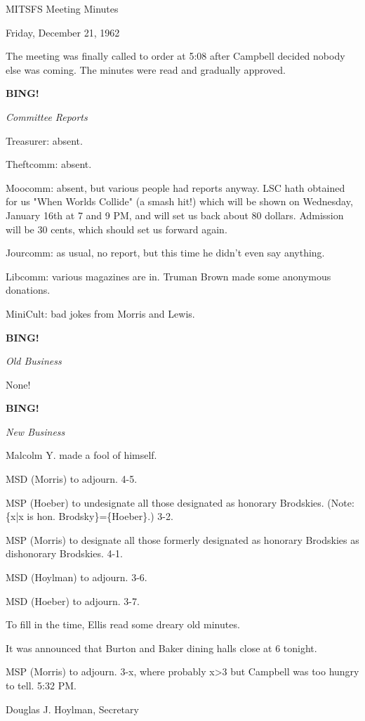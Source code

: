 \documentclass[12pt]{article}
\newcommand{\bing}{{\bf BING!} }
\newcommand{\goto}[1]{\bing \vskip 12pt \centerline{{\em{#1}}}}
\begin{document}
\begin{center}

MITSFS Meeting Minutes

Friday, December 21, 1962

\end{center}
 
\vspace{12pt}

\setlength{\parskip}{6pt}

\noindent
The meeting was finally called to order at 5:08 after Campbell decided nobody else was coming. The minutes were read and gradually approved.

\goto{Committee Reports}

Treasurer: absent.

Theftcomm: absent.

Moocomm: absent, but various people had reports anyway. LSC hath obtained for us "When Worlds Collide" (a smash hit!) which will be shown on Wednesday, January 16th at 7 and 9 PM, and will set us back about 80 dollars. Admission will be 30 cents, which should set us forward again.

Jourcomm: as usual, no report, but this time he didn't even say anything.

Libcomm: various magazines are in. Truman Brown made some anonymous donations.

MiniCult: bad jokes from Morris and Lewis.

\goto{Old Business}

None!

\goto{New Business}

Malcolm Y. made a fool of himself.

MSD (Morris) to adjourn. 4-5.

MSP (Hoeber) to undesignate all those designated as honorary Brodskies. (Note: \{x|x is hon. Brodsky\}=\{Hoeber\}.) 3-2.

MSP (Morris) to designate all those formerly designated as honorary Brodskies as dishonorary Brodskies. 4-1.

MSD (Hoylman) to adjourn. 3-6.

MSD (Hoeber) to adjourn. 3-7.

To fill in the time, Ellis read some dreary old minutes.

It was announced that Burton and Baker dining halls close at 6 tonight.

MSP (Morris) to adjourn. 3-x, where probably x>3 but Campbell was too hungry to tell. 5:32 PM.

\vspace{12pt}

\centerline{Douglas J. Hoylman, Secretary}
\end{document}
